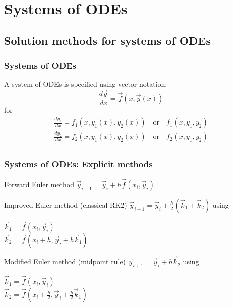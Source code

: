 \section{Systems of ODEs}
\subsection{Solution methods for systems of ODEs}
\begin{frame}
  \frametitle{Systems of ODEs}
  A system of ODEs is specified using vector notation:
  \[
    \frac{d\vec{y}}{dx} = \vec{f}(x,\vec{y}(x))
  \]
  for
  \begin{multline*}
    \frac{dy_1}{dx} = f_1(x,y_1(x),y_2(x)) \quad \text{or} \quad f_1(x,y_1,y_2)\\
    \frac{dy_2}{dx} = f_2(x,y_1(x),y_2(x)) \quad \text{or} \quad f_2(x,y_1,y_2)\\
  \end{multline*}
  \pause
\end{frame}

\begin{frame}
  \frametitle{Systems of ODEs: Explicit methods}
  \begin{block}{Forward Euler method}
    $ \displaystyle  \vec{y}_{i+1} = \vec{y}_i + h \vec{f}(x_i,\vec{y}_i) $
  \end{block}
  \begin{block}{Improved Euler method (classical RK2)}
    $\displaystyle \vec{y}_{i+1} = \vec{y}_i + \frac{h}{2}(\vec{k}_1+\vec{k}_2)$
    \quad using \quad \begin{minipage}{0.4\textwidth}
      $\displaystyle \vec{k}_1 = \vec{f}(x_i,\vec{y}_i)$\\
      $\displaystyle \vec{k}_2 = \vec{f}(x_i+h,\vec{y}_i+h\vec{k}_1)$
    \end{minipage}
  \end{block}  
  \begin{block}{Modified Euler method (midpoint rule)}
    $\displaystyle \vec{y}_{i+1} = \vec{y}_i + h\vec{k}_2$
    \quad using \quad \begin{minipage}{0.4\textwidth}
      $\displaystyle \vec{k}_1 = \vec{f}(x_i,\vec{y}_i)$\\
      $\displaystyle \vec{k}_2 = \vec{f}(x_i+\frac{h}{2},\vec{y}_i+\frac{h}{2}\vec{k}_1)$
    \end{minipage}
  \end{block}   
\end{frame}

